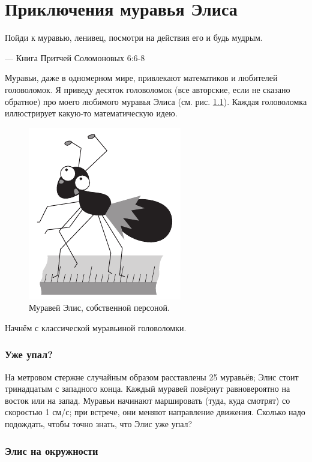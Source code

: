 \chapter{Приключения муравья Элиса}


\setlength{\epigraphwidth}{.67\textwidth}
\epigraph{Пойди к муравью, ленивец, посмотри на действия его и будь мудрым.
}{--- Книга Притчей Соломоновых 6:6-8} 

Муравьи, даже в одномерном мире, привлекают математиков и любителей головоломок.
Я приведу десяток головоломок (все авторские, если не сказано обратное) про моего любимого муравья Элиса
(см. рис. \ref{pic:alice1}).
Каждая головоломка иллюстрирует какую-то математическую идею.

\begin{figure}[ht!]
\centering
\includegraphics[scale=.7]{pics/alice1}
\caption{Муравей Элис, собственной персоной.}
\label{pic:alice1}
\end{figure}

Начнём с классической муравьиной головоломки.

\subsection*{Уже упал?}\label{Уже упал?}

На метровом стержне случайным образом расставлены 25 муравьёв; Элис стоит тринадцатым с западного конца.
Каждый муравей повёрнут равновероятно на восток или на запад.
Муравьи начинают маршировать (туда, куда смотрят) со скоростью 1 см/с;
при встрече, они меняют направление движения.
Сколько надо подождать, чтобы точно знать, что Элис уже упал?

\subsection*{Элис на окружности}\label{Элис на окружности}

